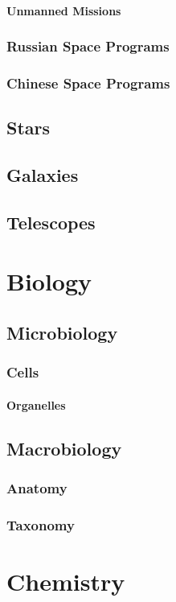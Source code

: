 \documentclass[12pt]{book}
\begin{document}
				\paragraph{Unmanned Missions}
				
			\subsubsection{Russian Space Programs}
			\subsubsection{Chinese Space Programs}
		\subsection{Stars}
		\subsection{Galaxies}
		\subsection{Telescopes}

	\section{Biology}
		\subsection{Microbiology}
			\subsubsection{Cells}
				\paragraph{Organelles}
		\subsection{Macrobiology}
			\subsubsection{Anatomy}
			\subsubsection{Taxonomy}
					
	\section{Chemistry}
\end{document}
